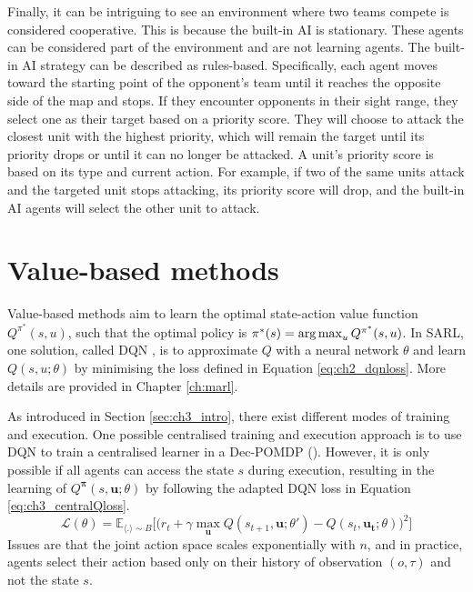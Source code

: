 Finally, it can be intriguing to see an environment where two teams compete is considered cooperative.
This is because the built-in AI is stationary. 
These agents can be considered part of the environment and are not learning agents.
The built-in AI strategy can be described as rules-based.
Specifically, each agent moves toward the starting point of the opponent's team until it reaches the opposite side of the map and stops.
If they encounter opponents in their sight range, they select one as their target based on a priority score.
They will choose to attack the closest unit with the highest priority, which will remain the target until its priority drops or until it can no longer be attacked.
A unit's priority score is based on its type and current action.
For example, if two of the same units attack and the targeted unit stops attacking, its priority score will drop, and the built-in AI agents will select the other unit to attack.


\section{Value-based methods}
\label{sec:ch3_value}

Value-based methods aim to learn the optimal state-action value function $Q^{\pi^*}(s, u)$, such that the optimal policy is $\pi^*(s)=\operatorname*{arg\,max}_{u} Q^{\pi^*}(s, u)$.
In SARL, one solution, called DQN \citep{Mnih2015}, is to approximate $Q$ with a neural network $\theta$ and learn $Q(s, u;\theta)$
by minimising the loss defined in Equation \ref{eq:ch2_dqnloss}.
More details are provided in Chapter \ref{ch:marl}.

As introduced in Section \ref{sec:ch3_intro}, there exist different modes of training and execution.
One possible centralised training and execution approach is to use DQN to train a centralised learner in a Dec-POMDP ().
However, it is only possible if all agents can access the state $s$ during execution, resulting in the learning of $Q^{\boldsymbol{\pi}}(s,\mathbf{u}; \theta)$ by following the adapted DQN loss in Equation \ref{eq:ch3_centralQloss}.
\begin{equation}
\label{eq:ch3_centralQloss}
    \mathcal{L}(\theta) = \mathbb{E}_{\langle . \rangle\sim B} \big[\big(r_{t} + \gamma \max_{\mathbf{u}} Q(s_{t+1}, \mathbf{u}; \theta')- Q(s_{t}, \mathbf{\mathbf{u_t}}; \theta)\big)^{2}\big]
\end{equation}
Issues are that the joint action space scales exponentially with $n$, and in practice, agents select their action based only on their history of observation $(o, \tau)$ and not the state $s$.

